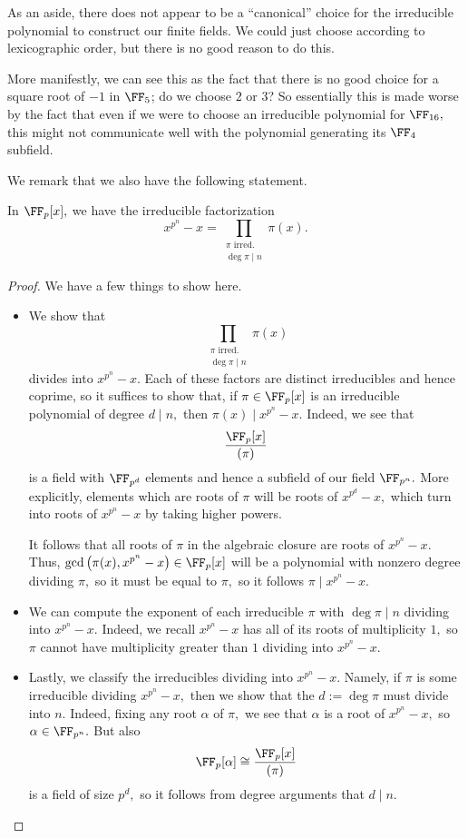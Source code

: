\documentclass[../notes.tex]{subfiles}
\begin{document}
As an aside, there does not appear to be a ``canonical'' choice for the irreducible polynomial to construct our finite fields. We could just choose according to lexicographic order, but there is no good reason to do this.

More manifestly, we can see this as the fact that there is no good choice for a square root of $-1$ in $\FF_5$; do we choose $2$ or $3$? So essentially this is made worse by the fact that even if we were to choose an irreducible polynomial for $\FF_{16},$ this might not communicate well with the polynomial generating its $\FF_4$ subfield.

We remark that we also have the following statement.
\begin{proposition} \label{prop:factorsplitter}
	In $\FF_p[x],$ we have the irreducible factorization
	\[x^{p^n}-x=\prod_{\substack{\pi\text{ irred.}\\\deg\pi\mid n}}\pi(x).\]
\end{proposition}
\begin{proof}
	We have a few things to show here.
	\begin{itemize}
		\item We show that
		\[\prod_{\substack{\pi\text{ irred.}\\\deg\pi\mid n}}\pi(x)\]
		divides into $x^{p^n}-x.$ Each of these factors are distinct irreducibles and hence coprime, so it suffices to show that, if $\pi\in\FF_p[x]$ is an irreducible polynomial of degree $d\mid n,$ then $\pi(x)\mid x^{p^n}-x.$ Indeed, we see that
		\[\frac{\FF_p[x]}{(\pi)}\]
		is a field with $\FF_{p^d}$ elements and hence a subfield of our field $\FF_{p^n}.$ More explicitly, elements which are roots of $\pi$ will be roots of $x^{p^d}-x,$ which turn into roots of $x^{p^n}-x$ by taking higher powers.

		It follows that all roots of $\pi$ in the algebraic closure are roots of $x^{p^n}-x.$ Thus, $\gcd\left(\pi(x),x^{p^n}-x\right)\in\FF_p[x]$ will be a polynomial with nonzero degree dividing $\pi,$ so it must be equal to $\pi,$ so it follows $\pi\mid x^{p^n}-x.$
		
		\item We can compute the exponent of each irreducible $\pi$ with $\deg\pi\mid n$ dividing into $x^{p^n}-x.$ Indeed, we recall $x^{p^n}-x$ has all of its roots of multiplicity $1,$ so $\pi$ cannot have multiplicity greater than $1$ dividing into $x^{p^n}-x.$

		\item Lastly, we classify the irreducibles dividing into $x^{p^n}-x.$ Namely, if $\pi$ is some irreducible dividing $x^{p^n}-x,$ then we show that the $d:=\deg\pi$ must divide into $n.$ Indeed, fixing any root $\alpha$ of $\pi,$ we see that $\alpha$ is a root of $x^{p^n}-x,$ so $\alpha\in\FF_{p^n}.$ But also
		\[\FF_p[\alpha]\cong\frac{\FF_p[x]}{(\pi)}\]
		is a field of size $p^d,$ so it follows from degree arguments that $d\mid n.$
		\qedhere
	\end{itemize}
\end{proof}
\end{document}
